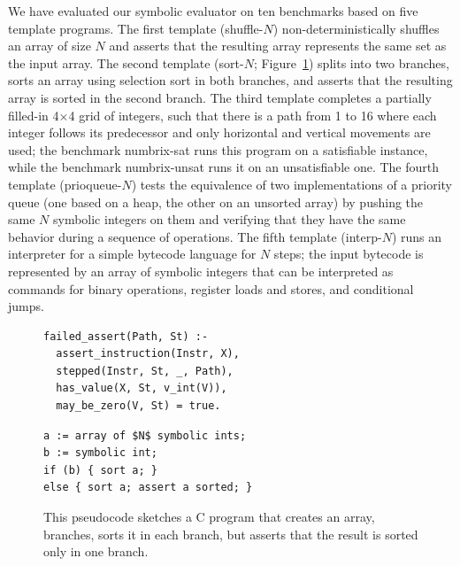 \documentclass[acmsmall,screen,nonacm]{acmart}
\theoremstyle{definition}
\begin{document}
We have evaluated our symbolic evaluator on ten benchmarks based on five
template programs.
The first template (shuffle-$N$) non-deterministically shuffles an array of
size $N$ and asserts that the resulting array represents the same set as the
input array.
The second template (sort-$N$; Figure~\ref{fig:sort})
splits into two branches, sorts an array using selection sort in both branches,
and asserts that the resulting array is sorted in the second branch.
The third template completes a partially filled-in 4$\times$4 grid of integers,
such that there is a path from 1 to 16 where each integer follows its
predecessor and only horizontal and vertical movements are used;
the benchmark numbrix-sat runs this program on a satisfiable instance, while
the benchmark numbrix-unsat runs it on an unsatisfiable one.
The fourth template (prioqueue-$N$) tests the equivalence of two
implementations of a priority queue (one based on a heap, the other on an
unsorted array) by pushing the same $N$ symbolic integers on them and verifying
that they have the same behavior during a sequence of operations. 
The fifth template (interp-$N$) runs an interpreter for a simple bytecode
language for $N$ steps; the input bytecode is represented by an array of
symbolic integers that can be interpreted as commands for binary operations,
register loads and stores, and conditional jumps.

\begin{figure}[!t]
  \begin{minipage}[b]{0.45\textwidth}
  \begin{lstlisting}
failed_assert(Path, St) :-
  assert_instruction(Instr, X),
  stepped(Instr, St, _, Path),
  has_value(X, St, v_int(V)),
  may_be_zero(V, St) = true.\end{lstlisting}
	\caption{This rule states that the symbolic evaluator has reached a failing
assertion when the argument of the assert instruction may be zero.}
  \label{fig:failed_assume}
  \end{minipage}\hspace{2em}%
  \begin{minipage}[b]{0.45\textwidth}
  \begin{lstlisting}
a := array of $N$ symbolic ints;
b := symbolic int;
if (b) { sort a; }
else { sort a; assert a sorted; }
\end{lstlisting}
	\caption{This pseudocode sketches a C program that creates an array,
branches, sorts it in each branch, but asserts that the result is sorted
only in one branch.}
  \label{fig:sort}
  \end{minipage}
\end{figure}
\end{document}
